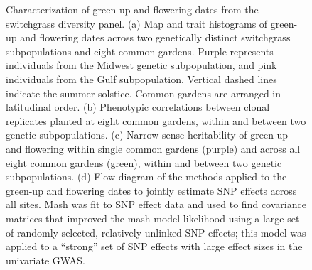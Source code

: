 \documentclass[
  9pt,
  twocolumn,
  twoside]{pnas-new}
\begin{document}
\begin{figure}


\caption{\label{fig-map}Characterization of green-up and flowering dates
from the switchgrass diversity panel. (a) Map and trait histograms of
green-up and flowering dates across two genetically distinct switchgrass
subpopulations and eight common gardens. Purple represents individuals
from the Midwest genetic subpopulation, and pink individuals from the
Gulf subpopulation. Vertical dashed lines indicate the summer solstice.
Common gardens are arranged in latitudinal order. (b) Phenotypic
correlations between clonal replicates planted at eight common gardens,
within and between two genetic subpopulations. (c) Narrow sense
heritability of green-up and flowering within single common gardens
(purple) and across all eight common gardens (green), within and between
two genetic subpopulations. (d) Flow diagram of the methods applied to
the green-up and flowering dates to jointly estimate SNP effects across
all sites. Mash was fit to SNP effect data and used to find covariance
matrices that improved the mash model likelihood using a large set of
randomly selected, relatively unlinked SNP effects; this model was
applied to a ``strong'' set of SNP effects with large effect sizes in
the univariate GWAS.}

\end{figure}%
\end{document}
